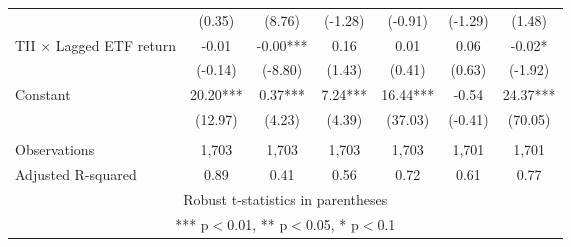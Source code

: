\documentclass[]{article}
\begin{document}
\begin{tabular}{lcccccc}
 & (0.35) & (8.76) & (-1.28) & (-0.91) & (-1.29) & (1.48) \\
TII $\times$ Lagged ETF return & -0.01 & -0.00*** & 0.16 & 0.01 & 0.06 & -0.02* \\
 & (-0.14) & (-8.80) & (1.43) & (0.41) & (0.63) & (-1.92) \\
Constant & 20.20*** & 0.37*** & 7.24*** & 16.44*** & -0.54 & 24.37*** \\
 & (12.97) & (4.23) & (4.39) & (37.03) & (-0.41) & (70.05) \\
 &  &  &  &  &  &  \\
Observations & 1,703 & 1,703 & 1,703 & 1,703 & 1,701 & 1,701 \\
 Adjusted R-squared & 0.89 & 0.41 & 0.56 & 0.72 & 0.61 & 0.77 \\ \hline
\multicolumn{7}{c}{ Robust t-statistics in parentheses} \\
\multicolumn{7}{c}{ *** p$<$0.01, ** p$<$0.05, * p$<$0.1} \\
\end{tabular}
\end{document}
